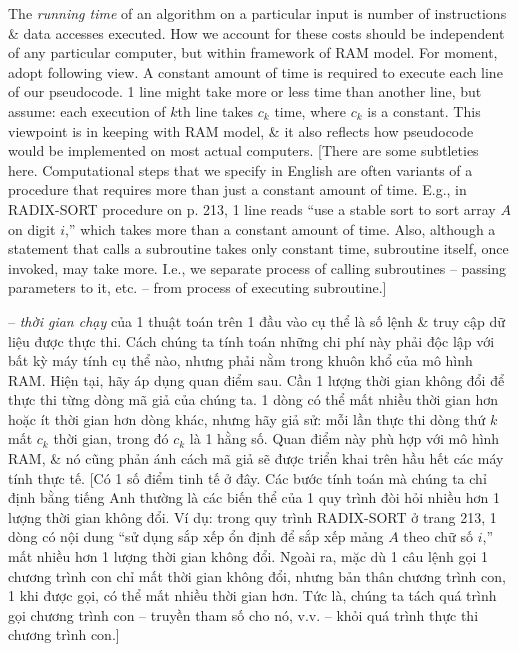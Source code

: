 \documentclass{article}
\begin{document}
\begin{itemize}
\begin{itemize}
\begin{itemize}
            The {\it running time} of an algorithm on a particular input is number of instructions \& data accesses executed. How we account for these costs should be independent of any particular computer, but within framework of RAM model. For moment, adopt following view. A constant amount of time is required to execute each line of our pseudocode. 1 line might take more or less time than another line, but assume: each execution of $k$th line takes $c_k$ time, where $c_k$ is a constant. This viewpoint is in keeping with RAM model, \& it also reflects how pseudocode would be implemented on most actual computers. [There are some subtleties here. Computational steps that we specify in English are often variants of a procedure that requires more than just a constant amount of time. E.g., in RADIX-SORT procedure on p. 213, 1 line reads ``use a stable sort to sort array $A$ on digit $i$,'' which takes more than a constant amount of time. Also, although a statement that calls a subroutine takes only constant time, subroutine itself, once invoked, may take more. I.e., we separate process of calling subroutines -- passing parameters to it, etc. -- from process of executing subroutine.]
            
            -- {\it thời gian chạy} của 1 thuật toán trên 1 đầu vào cụ thể là số lệnh \& truy cập dữ liệu được thực thi. Cách chúng ta tính toán những chi phí này phải độc lập với bất kỳ máy tính cụ thể nào, nhưng phải nằm trong khuôn khổ của mô hình RAM. Hiện tại, hãy áp dụng quan điểm sau. Cần 1 lượng thời gian không đổi để thực thi từng dòng mã giả của chúng ta. 1 dòng có thể mất nhiều thời gian hơn hoặc ít thời gian hơn dòng khác, nhưng hãy giả sử: mỗi lần thực thi dòng thứ $k$ mất $c_k$ thời gian, trong đó $c_k$ là 1 hằng số. Quan điểm này phù hợp với mô hình RAM, \& nó cũng phản ánh cách mã giả sẽ được triển khai trên hầu hết các máy tính thực tế. [Có 1 số điểm tinh tế ở đây. Các bước tính toán mà chúng ta chỉ định bằng tiếng Anh thường là các biến thể của 1 quy trình đòi hỏi nhiều hơn 1 lượng thời gian không đổi. Ví dụ: trong quy trình RADIX-SORT ở trang 213, 1 dòng có nội dung ``sử dụng sắp xếp ổn định để sắp xếp mảng $A$ theo chữ số $i$,'' mất nhiều hơn 1 lượng thời gian không đổi. Ngoài ra, mặc dù 1 câu lệnh gọi 1 chương trình con chỉ mất thời gian không đổi, nhưng bản thân chương trình con, 1 khi được gọi, có thể mất nhiều thời gian hơn. Tức là, chúng ta tách quá trình gọi chương trình con -- truyền tham số cho nó, v.v. -- khỏi quá trình thực thi chương trình con.]
            

\end{itemize}
\end{itemize}
\end{itemize}
\end{document}
